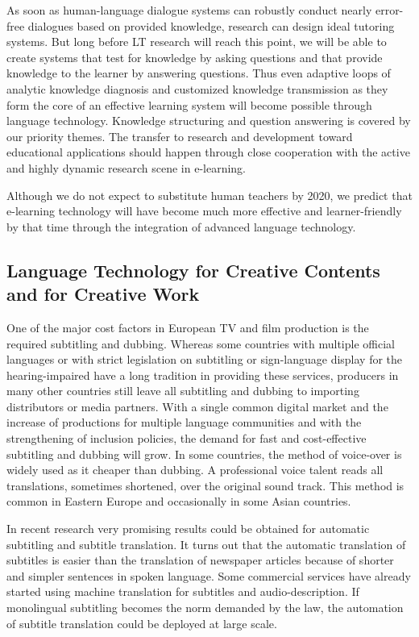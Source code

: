\begin{multicols}{2}
As soon as human-language dialogue systems can robustly conduct nearly error-free dialogues based on provided knowledge, research can design ideal tutoring systems. But long before LT research will reach this point, we will be able to create systems that test for knowledge by asking questions and that provide knowledge to the learner by answering questions. Thus even adaptive loops of analytic knowledge diagnosis and customized knowledge transmission as they form the core of an effective learning system will become possible through language technology. Knowledge structuring and question answering is covered by our priority themes. The transfer to research and development toward educational applications should happen through close cooperation with the active and highly dynamic research scene in e-learning.
 
Although we do not expect to substitute human teachers by 2020, we predict that e-learning technology will have become much more effective and learner-friendly by that time through the integration of advanced language technology.

\subsection{Language Technology for Creative Contents and for Creative Work}
\label{sec:lt-creative-contents}

One of the major cost factors in European TV and film production is the required subtitling and dubbing. Whereas some countries with multiple official languages or with strict legislation on subtitling or sign-language display for the hearing-impaired have a long tradition in providing these services, producers in many other countries still leave all subtitling and dubbing to importing distributors or media partners. With a single common digital market and the increase of productions for multiple language communities and with the strengthening of inclusion policies, the demand for fast and cost-effective subtitling and dubbing will grow. In some countries, the method of voice-over is widely used as it cheaper than dubbing. A professional voice talent reads all translations, sometimes shortened, over the original sound track. This method is common in Eastern Europe and occasionally in some Asian countries. 
 
In recent research very promising results could be obtained for automatic subtitling and subtitle translation. It turns out that the automatic translation of subtitles is easier than the translation of newspaper articles because of shorter and simpler sentences in spoken language. Some commercial services have already started using machine translation for subtitles and audio-description. If monolingual subtitling becomes the norm demanded by the law, the automation of subtitle translation could be deployed at large scale.
 

\end{multicols}
